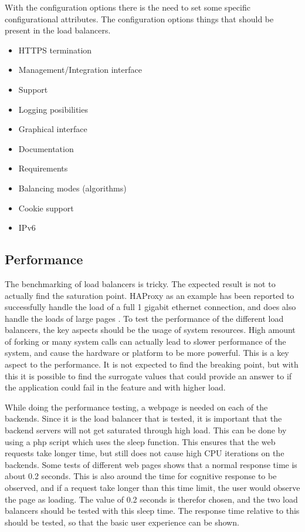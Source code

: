 With the configuration options there is the need to set some specific
configurational attributes. The configuration options things that should be
present in the load balancers. 
\begin{itemize}
    \item HTTPS termination
    \item Management/Integration interface 
    \item Support
    \item Logging posibilities
    \item Graphical interface
    \item Documentation
    \item Requirements
    \item Balancing modes (algorithms)
    \item Cookie support
    \item IPv6
\end{itemize}

\subsection{Performance}
The benchmarking of load balancers is tricky. The expected result is not to
actually find the saturation point. HAProxy as an example has been reported to
successfully handle the load of a full 1 gigabit ethernet connection, and does also
handle the loads of large pages \cite{haproxy:2014}. To test the performance of
the different load balancers, the key aspects should be the usage of system
resources. High amount of forking or many system calls can actually
lead to slower performance of the system, and cause the hardware or platform to
be more powerful. This is a key aspect to the performance. It is not expected
to find the breaking point, but with this it is possible to find the surrogate
values that could provide an answer to if the application could fail in the
feature and with higher load.

While doing the performance testing, a webpage is needed on each of the
backends. Since it is the load balancer that is tested, it is important that
the backend servers will not get saturated through high load. This can be done
by using a php script which uses the sleep function. This ensures that the web
requests take longer time, but still does not cause high CPU iterations on the
backends. Some tests of different web pages shows that a normal response time
is about 0.2 seconds. This is also around the time for cognitive response to be
observed, and if a request take longer than this time limit, the user would
observe the page as loading. The value of 0.2 seconds is therefor chosen, and
the two load balancers should be tested with this sleep time. The response time
relative to this should be tested, so that the basic user experience can be
shown.

